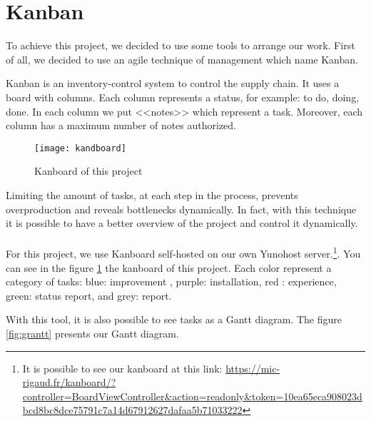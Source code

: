 
\section{Kanban}

To achieve this project, we decided to use some tools to arrange our work. First of all, we decided to use an agile
technique of management which name Kanban.~\\



Kanban is an inventory-control system to control the supply chain. It uses a board with columns. Each column
represents a status, for example: to do, doing, done. In each column we put <<notes>> which represent a task.
Moreover, each column has a maximum number of notes authorized.


\begin{figure}[h]
  \centering
  \texttt{[image: kandboard]}
  \caption{Kanboard of this project}
  \label{fig:kanboard}
\end{figure}


Limiting the amount of tasks, at each step in the process, prevents overproduction and reveals bottlenecks
dynamically. In fact, with this technique it is possible to have a better overview of the project and control it
dynamically.
~\\

For this project, we use Kanboard\cite{guillot:kanboard} self-hosted on our own Yunohost server.\footnote{ It is possible to
  see our kanboard at this link:
  \url{https://mic-rigaud.fr/kanboard/?controller=BoardViewController&action=readonly&token=10ea65eca908023dbcd8bc8dce75791c7a14d67912627dafaa5b71033222}}.
You can see in the figure \ref{fig:kanboard} the kanboard of this project. Each color represent a category of tasks:
blue: improvement , purple: installation, red : experience, green: status report, and grey: report.

With this tool, it is also possible to see tasks as a Gantt diagram. The figure \ref{fig:grantt} presents our
Gantt diagram.

